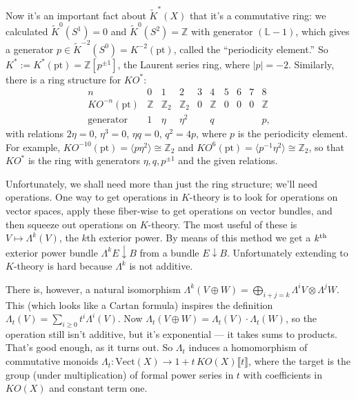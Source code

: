 \documentclass{article}
\newcommand{\Z}{\mathbb{Z}}
\newcommand{\bundle}[1]{\mathbb{#1}}
\newcommand{\ptspace}{\mathrm{pt}}
\renewcommand{\to}{\longrightarrow}
\renewcommand{\mapsto}{\longmapsto}
\theoremstyle{definition}
\begin{document}
Now it's an important fact about $\widetilde K^* (X)$ that it's a commutative ring: we calculated $\widetilde K^0 (S^1) = 0$ and $\widetilde K^0 (S^2) = \Z$ with generator $(\bundle{L} - 1)$, which gives a generator $p \in \widetilde K^{-2} (S^0) = K^{-2} (\ptspace)$, called the ``periodicity element.''  So $K^* := K^* (\ptspace) = \Z[p^{\pm 1}]$, the Laurent series ring, where $|p| = -2$.  Similarly, there is a ring structure for $KO^*$:
\[
\begin{array}{c|ccccccccc}
n & 0 & 1 & 2 & 3 & 4 & 5 & 6 & 7 & 8 \\
\hline
KO^{-n} (\ptspace) & \Z & \Z_2 & \Z_2 & 0 & \Z & 0 & 0 & 0 & \Z \\
\mathrm{generator} & 1 & \eta & \eta^2 & & q & & & & p,
\end{array}
\]
with relations $2\eta = 0$, $\eta^3 = 0$, $\eta q = 0$, $q^2 = 4p$, where $p$ is the periodicity element. For example, $KO^{-10}(\ptspace) = \langle p\eta^2 \rangle \cong \Z_2$ and $KO^{6}(\ptspace) = \langle p^{-1}\eta^2 \rangle \cong \Z_2$, so that $KO^*$ is the ring with generators $\eta,q,p^{\pm1}$ and the given relations.

Unfortunately, we shall need more than just the ring structure; we'll need operations.  One way to get operations in $K$-theory is to look for operations on vector spaces, apply these fiber-wise to get operations on vector bundles, and then squeeze out operations on $K$-theory.  The most useful of these is $V \mapsto \Lambda^k(V)$, the $k$th exterior power.  By means of this method we get a $k^\textup{th}$ exterior power bundle $\Lambda^k E \downarrow B$ from a bundle $E\downarrow B$.  Unfortunately extending to $K$-theory is hard because $\Lambda^k$ is not additive. 

There is, however, a natural isomorphism $\Lambda^k(V \oplus W) = \bigoplus_{i+j = k} \Lambda^i V \otimes \Lambda^j W$.  This (which looks like a Cartan formula) inspires the definition $\Lambda_t(V) = \sum_{i \ge 0} t^i \Lambda^i(V)$.  Now $\Lambda_t(V \oplus W) = \Lambda_t(V) \cdot \Lambda_t(W)$, so the operation still isn't additive, but it's exponential --- it takes sums to products.  That's good enough, as it turns out.  So $\Lambda_t$ induces a homomorphism of commutative monoids $\Lambda_t: \mathrm{Vect}(X) \to 1 + t\,KO(X)\llbracket t \rrbracket$, where the target is the group (under multiplication) of formal power series in $t$ with coefficients in $KO(X)$ and constant term one.
\end{document}
